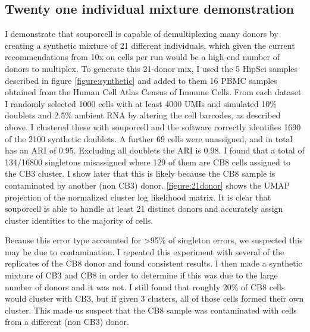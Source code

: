 \subsection{Twenty one individual mixture demonstration}
\par{
I demonstrate that souporcell is capable of demultiplexing many donors by creating a synthetic mixture
of 21 different individuals, which given the current recommendations from 10x on cells per run would be
a high-end number of donors to multiplex. To generate this 21-donor mix, I used the 5 HipSci samples
described in figure \ref{figure:synthetic} and added to them 16 PBMC samples obtained from the Human Cell Atlas Census of
Immune Cells. From each dataset I randomly selected 1000 cells with at least 4000 UMIs and
simulated 10\% doublets and 2.5\% ambient RNA by altering the cell barcodes, as described above. I
clustered these with souporcell and the software correctly identifies 1690 of the 2100 synthetic doublets.
A further 69 cells were unassigned, and in total has an ARI of 0.95. Excluding all doublets the ARI
is 0.98. I found that a total of 134/16800 singletons misassigned where 129 of them are CB8 cells assigned to
the CB3 cluster. I show later that this is likely because the CB8 sample is contaminated by another
(non CB3) donor. \ref{figure:21donor} shows the UMAP projection of the normalized cluster log likelihood
matrix. It is clear that souporcell is able to handle at least 21 distinct donors and accurately assign cluster
identities to the majority of cells. 
} 

\par{
Because this error type accounted for >95\% of singleton errors, we suspected this may be due to
contamination. I repeated this experiment with several of the replicates of the CB8 donor and found
consistent results. I then made a synthetic mixture of CB3 and CB8 in order to determine if this was
due to the large number of donors and it was not. I still found that roughly 20\% of CB8 cells would
cluster with CB3, but if given 3 clusters, all of those cells formed their own cluster. This made us suspect 
that the CB8 sample was contaminated with cells from a different (non CB3) donor.
}


